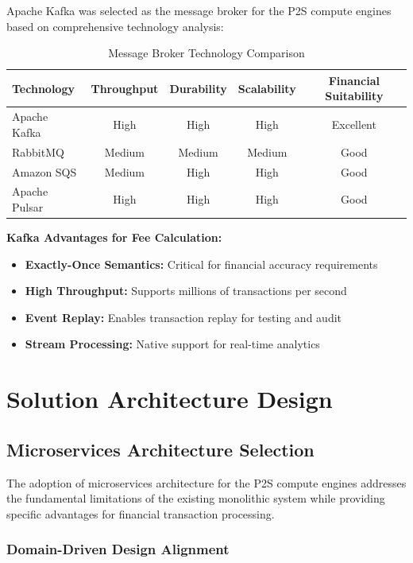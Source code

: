 Apache Kafka was selected as the message broker for the P2S compute engines based on comprehensive technology analysis:

\begin{table}[h]
\centering
\begin{tabular}{|l|c|c|c|c|}
\hline
\textbf{Technology} & \textbf{Throughput} & \textbf{Durability} & \textbf{Scalability} & \textbf{Financial Suitability} \\
\hline
Apache Kafka & High & High & High & Excellent \\
RabbitMQ & Medium & Medium & Medium & Good \\
Amazon SQS & Medium & High & High & Good \\
Apache Pulsar & High & High & High & Good \\
\hline
\end{tabular}
\caption{Message Broker Technology Comparison}
\end{table}

\textbf{Kafka Advantages for Fee Calculation:}
\begin{itemize}
    \item \textbf{Exactly-Once Semantics:} Critical for financial accuracy requirements
    \item \textbf{High Throughput:} Supports millions of transactions per second
    \item \textbf{Event Replay:} Enables transaction replay for testing and audit
    \item \textbf{Stream Processing:} Native support for real-time analytics
\end{itemize}

\section{Solution Architecture Design}

\subsection{Microservices Architecture Selection}

The adoption of microservices architecture for the P2S compute engines addresses the fundamental limitations of the existing monolithic system while providing specific advantages for financial transaction processing.

\subsubsection{Domain-Driven Design Alignment}

